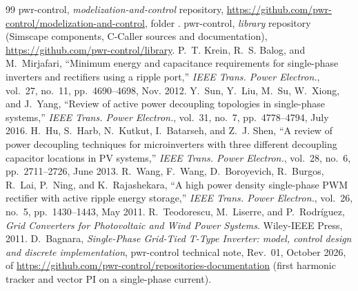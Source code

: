\documentclass[11pt,a4paper]{scrartcl}
\begin{document}
\begin{onehalfspace}
\begin{thebibliography}{99}
	 pwr-control, \textit{modelization-and-control} repository, \url{https://github.com/pwr-control/modelization-and-control}, folder .
	 pwr-control, \textit{library} repository (Simscape components, C-Caller sources and documentation), \url{https://github.com/pwr-control/library}.
	 P.~T. Krein, R.~S. Balog, and M.~Mirjafari, ``Minimum energy and capacitance requirements for single-phase inverters and rectifiers using a ripple port,'' \emph{IEEE Trans. Power Electron.}, vol.~27, no.~11, pp.~4690--4698, Nov. 2012.
	 Y.~Sun, Y.~Liu, M.~Su, W.~Xiong, and J.~Yang, ``Review of active power decoupling topologies in single-phase systems,'' \emph{IEEE Trans. Power Electron.}, vol.~31, no.~7, pp.~4778--4794, July 2016.
	 H.~Hu, S.~Harb, N.~Kutkut, I.~Batarseh, and Z.~J. Shen, ``A review of power decoupling techniques for microinverters with three different decoupling capacitor locations in PV systems,'' \emph{IEEE Trans. Power Electron.}, vol.~28, no.~6, pp.~2711--2726, June 2013.
	 R.~Wang, F.~Wang, D.~Boroyevich, R.~Burgos, R.~Lai, P.~Ning, and K.~Rajashekara, ``A high power density single-phase PWM rectifier with active ripple energy storage,'' \emph{IEEE Trans. Power Electron.}, vol.~26, no.~5, pp.~1430--1443, May 2011.
	 R.~Teodorescu, M.~Liserre, and P.~Rodr\'iguez, \emph{Grid Converters for Photovoltaic and Wind Power Systems}. Wiley-IEEE Press, 2011.
	 D.~Bagnara, \textit{Single-Phase Grid-Tied T-Type Inverter: model, control design and discrete implementation}, pwr-control technical note, Rev.~01, October 2026,  of \url{https://github.com/pwr-control/repositories-documentation} (first harmonic tracker and vector PI on a single-phase current).
\end{thebibliography}

\end{onehalfspace}
\end{document}
